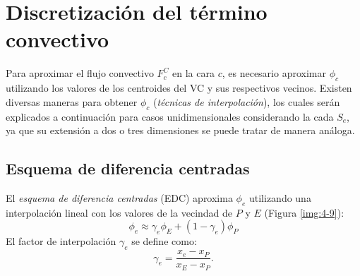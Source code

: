 \documentclass[a4paper,10pt, oneside]{book}
\begin{document}
\pagebreak

\section{Discretización del término convectivo}

Para aproximar el flujo convectivo $F_c^C$ en la cara $c$, es necesario aproximar $\phi_c$ utilizando los valores de los centroides del VC y sus respectivos vecinos. Existen diversas maneras para obtener $\phi_c$ (\textit{técnicas de interpolación}), los cuales serán explicados a continuación para casos unidimensionales considerando la cada $S_e$, ya que su extensión a dos o tres dimensiones se puede tratar de manera análoga.

\subsection{Esquema de diferencia centradas}

El \textit{esquema de diferencia centradas} (EDC) aproxima $\phi_e$ utilizando una interpolación lineal con los valores de la vecindad de $P$ y $E$ (Figura \ref{img:4-9}):
\begin{equation}
	\phi_e \approx \gamma_e \phi_E + (1-\gamma_e) \phi_P
	\label{eq:4-7}
\end{equation}
El factor de interpolación $\gamma_e$ se define como:
\begin{equation}
	\gamma_e = \frac{x_e - x_P}{x_E - x_P}. \nonumber
\end{equation}
\end{document}
